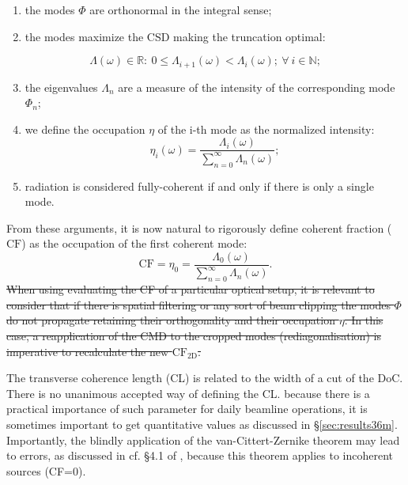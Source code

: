\documentclass{iucr}              %
\newcommand{\remove}[1]{ {\color{blue} \sout{#1}}}
\begin{document}
\begin{enumerate}[label=(\roman*)]
\item the modes $\Phi$ are orthonormal in the integral sense;
\item the modes maximize the CSD making the truncation optimal:
\end{enumerate}
\begin{equation*}
\Lambda(\omega) \in \mathbb{R}
:~0\leq \Lambda_{i+1}(\omega)<\Lambda_i(\omega);~\forall~i \in \mathbb{N};
\end{equation*}
\begin{enumerate}[label=(\roman*)]
\setcounter{enumi}{2}
\item the eigenvalues $\Lambda_n$ are a measure of the intensity of the corresponding mode $\Phi_{n}$; 
\item we define the occupation $\eta$ of the i-th mode as the normalized intensity: 
\begin{equation}
\eta_i(\omega) =\frac{\Lambda_i(\omega)}{\sum\limits_{n=0}^\infty{\Lambda_n(\omega)}};
\end{equation}
\item radiation is considered fully-coherent if and only if there is only a single mode.
\end{enumerate}

From these arguments, it is now natural to rigorously define coherent fraction ($\text{CF}$) as the occupation of the first coherent mode:
\begin{equation}
\text{CF}=\eta_0=\frac{\Lambda_0(\omega)}{\sum\limits_{n=0}^\infty{\Lambda_n(\omega)}}. \label{eq:CF2D}
\end{equation}
\remove{When using evaluating the CF of a particular optical setup, it is relevant to consider that if there is spatial filtering or any sort of beam clipping the modes $\Phi$ do not propagate retaining their orthogonality and their occupation $\eta$. In this case, a reapplication of the CMD to the cropped modes (rediagonalisation) is imperative to recalculate the new $\text{CF}_\text{2D}$.}

The transverse coherence length (CL) is related to the width of a cut of the DoC. There is no unanimous accepted way of defining the CL. because there is a practical importance of such parameter for daily beamline operations, it is sometimes important to get quantitative values as discussed in \S{\ref{sec:results36m}}. Importantly, the blindly application of the van-Cittert-Zernike theorem may lead to errors, as discussed in cf. §4.1 of \cite{geloni2008}, because this theorem applies to incoherent sources (CF=0). 
\end{document}
